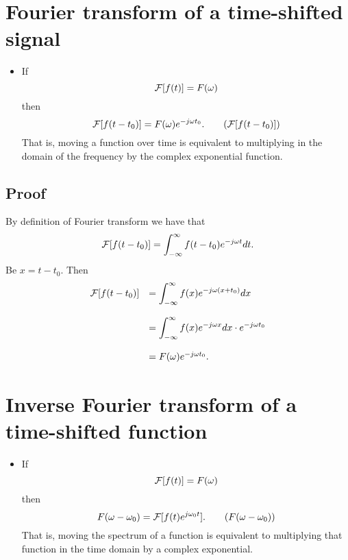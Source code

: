 \section{Fourier transform of a time-shifted signal}
\begin{itemize}
\item [] If
  \begin{equation*}
  {\cal F}[f(t)] = F(\omega)
  \end{equation*}
  then
  \begin{equation}
    {\cal F}[f(t-t_0)] = F(\omega)e^{-j\omega t_0}.
    \tag{${\cal F}[f(t-t_0)]$}
    \label{eq:TFfdt}
  \end{equation}
  That is, moving a function over time is equivalent to multiplying in
  the domain of the frequency by the complex exponential function.
\end{itemize}

\subsection*{Proof}
\noindent By definition of Fourier transform we have that
$$
{\cal F}[f(t-t_0)] = \int_{-\infty}^\infty f(t-t_0)e^{-j\omega t}dt.
$$
Be $x=t-t_0$. Then
$$
\begin{array}{rl}
  {\cal F}[f(t-t_0)] & = \displaystyle\int_{-\infty}^\infty
  f(x)e^{-j\omega(x+t_0)}dx\\\\
  & = \displaystyle\int_{-\infty}^\infty f(x)e^{-j\omega x}dx\cdot e^{-j\omega t_0}\\\\
  & = F(\omega)e^{-j\omega t_0}.
\end{array}
$$


\section{Inverse Fourier transform of a time-shifted function}

\begin{itemize}
\item [] If
  \begin{equation*}
    {\cal F}[f(t)] = F(\omega)
  \end{equation*}
  then
  \begin{equation}
    F(\omega-\omega_0) = {\cal F}[f(t)e^{j\omega_0t}].
    \tag{$F(\omega-\omega_0)$}
    \label{eq:TFifdf}
  \end{equation}
  That is, moving the spectrum of a function is equivalent to
  multiplying that function in the time domain by a complex
  exponential.
\end{itemize}

